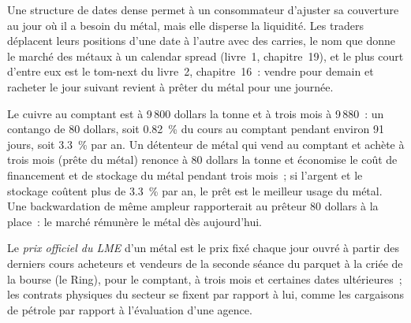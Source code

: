\begin{omfigure}

\label{fig:m3:metals:prompts}
\end{omfigure}

Une structure de dates dense permet à un consommateur d'ajuster sa couverture au jour où il a besoin du métal, mais elle
disperse la liquidité. Les traders déplacent leurs positions d'une date à l'autre avec des carries, le nom
que donne le marché des métaux à un calendar spread (livre~1, chapitre~19), et le plus court d'entre eux est le
tom-next du livre~2, chapitre~16~: vendre pour demain et racheter le jour suivant
revient à prêter du métal pour une journée.

\begin{example}\label{ex:m3:metals:carry}
Le cuivre au comptant est à 9\,800 dollars la tonne et à trois mois à 9\,880~: un contango de 80 dollars, soit 0.82~\% du
cours au comptant pendant environ 91 jours, soit 3.3~\% par an. Un détenteur de métal qui vend au comptant et achète à trois
mois (prête du métal) renonce à 80 dollars la tonne et économise le coût de financement et de stockage du
métal pendant trois mois~; si l'argent et le stockage coûtent plus de 3.3~\% par an, le prêt est le meilleur
usage du métal. Une backwardation de même ampleur rapporterait au prêteur 80 dollars à la place~: le
marché rémunère le métal dès aujourd'hui.
\end{example}

\begin{definition}\label{def:m3:metals:official}
Le \emph{prix officiel du LME} d'un métal est le prix fixé chaque
jour ouvré à partir des derniers cours acheteurs et vendeurs de la seconde séance du
parquet à la criée de la bourse (le Ring), pour le comptant, à trois mois et certaines dates ultérieures~; les contrats physiques du secteur
se fixent par rapport à lui, comme les cargaisons de pétrole par rapport à l'évaluation d'une agence.
\end{definition}

